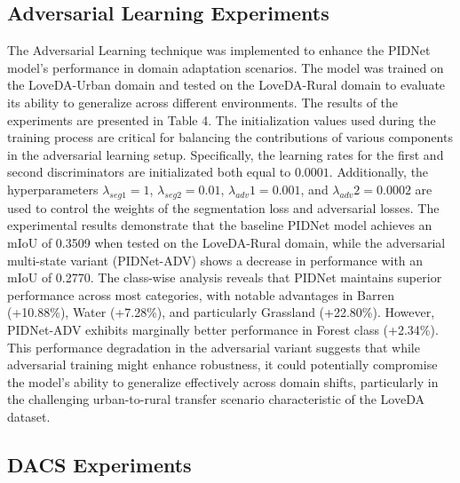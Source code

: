 \documentclass[10pt,twocolumn,letterpaper]{article}
\begin{document}
\subsection{Adversarial Learning Experiments}

The Adversarial Learning technique was implemented to enhance the PIDNet model's performance in domain adaptation scenarios. The model was trained on the LoveDA-Urban domain and tested on the LoveDA-Rural domain to evaluate its ability to generalize across different environments. The results of the experiments are presented in Table 4.
The initialization values used during the training process are critical for balancing the contributions of various components in the adversarial learning setup. Specifically, the learning rates for the first and second discriminators are initializated both equal to $0.0001$. Additionally, the hyperparameters ${\lambda_{seg1}} = 1$, ${\lambda_{seg2}} = 0.01$, ${\lambda_{adv}1} = 0.001$, and ${\lambda_{adv}2} = 0.0002$ are used to control the weights of the segmentation loss and adversarial losses. 
The experimental results demonstrate that the baseline PIDNet model achieves an mIoU of 0.3509 when tested on the LoveDA-Rural domain, while the adversarial multi-state variant (PIDNet-ADV) shows a decrease in performance with an mIoU of 0.2770. The class-wise analysis reveals that PIDNet maintains superior performance across most categories, with notable advantages in Barren (+10.88\%), Water (+7.28\%), and particularly Grassland (+22.80\%). However, PIDNet-ADV exhibits marginally better performance in Forest class (+2.34\%). This performance degradation in the adversarial variant suggests that while adversarial training might enhance robustness, it could potentially compromise the model's ability to generalize effectively across domain shifts, particularly in the challenging urban-to-rural transfer scenario characteristic of the LoveDA dataset.

\subsection{DACS Experiments}
\end{document}
